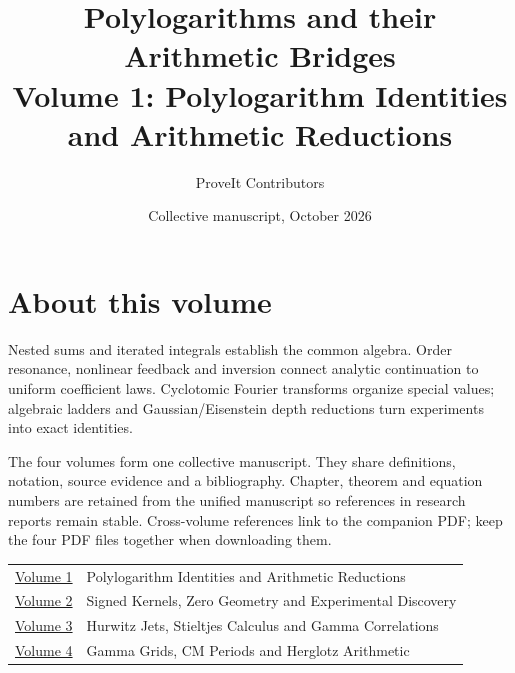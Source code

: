 

\title{Polylogarithms and their Arithmetic Bridges\\[8pt]
\large Volume 1: Polylogarithm Identities and Arithmetic Reductions}
\author{ProveIt Contributors}
\date{Collective manuscript, October 2026}

\pagestyle{plain}
\frontmatter
\maketitle
\chapter*{About this volume}
Nested sums and iterated integrals establish the common algebra. Order
resonance, nonlinear feedback and inversion connect analytic continuation
to uniform coefficient laws. Cyclotomic Fourier transforms organize
special values; algebraic ladders and Gaussian/Eisenstein depth reductions
turn experiments into exact identities.

The four volumes form one collective manuscript. They share definitions,
notation, source evidence and a bibliography. Chapter, theorem and equation
numbers are retained from the unified manuscript so references in research
reports remain stable. Cross-volume references link to the companion PDF;
keep the four PDF files together when downloading them.

\begin{center}
\begin{tabular}{@{}p{0.8in}p{5.5in}@{}}
\href{volume-1-polylogarithm-identities.pdf}{Volume 1} & Polylogarithm Identities and Arithmetic Reductions \\
\href{volume-2-signed-kernels.pdf}{Volume 2} & Signed Kernels, Zero Geometry and Experimental Discovery \\
\href{volume-3-hurwitz-stieltjes.pdf}{Volume 3} & Hurwitz Jets, Stieltjes Calculus and Gamma Correlations \\
\href{volume-4-cm-and-herglotz.pdf}{Volume 4} & Gamma Grids, CM Periods and Herglotz Arithmetic \\
\end{tabular}
\end{center}

